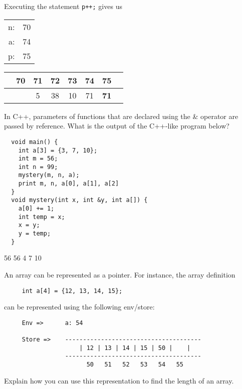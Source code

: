 \documentclass[addpoints]{exam}
\begin{document}
\begin{questions}
\begin{solution}
    Executing the statement \texttt{p++;} gives us

    \begin{tabular}{|r c|}
      \hline
      n: & 70 \\
      a: & 74 \\
      p: & 75 \\
      \hline
    \end{tabular}
    \hspace{1cm}
    \begin{tabular}{c|c|c|c|c|c|c|c}
      \hline
      \multicolumn{1}{c}{} & \multicolumn{1}{c}{70} & \multicolumn{1}{c}{71} & \multicolumn{1}{c}{72} & \multicolumn{1}{c}{73} & \multicolumn{1}{c}{74} & \multicolumn{1}{c}{75} & \\\hline
      &  \bigstrut 38 &  5 & 38 & 10 & 71 & \textbf{71} & \\[1ex]\hline
    \end{tabular}
  \end{solution}

  \newpage
  \question
  In C++, parameters of functions that are declared using the 
  \& operator are passed by reference.
  What is the output of the C++-like program below?
  \begin{verbatim}
  void main() {
    int a[3] = {3, 7, 10};
    int m = 56;
    int n = 99;
    mystery(m, n, a);
    print m, n, a[0], a[1], a[2]
  }
  void mystery(int x, int &y, int a[]) {
    a[0] += 1;
    int temp = x;
    x = y;
    y = temp;
  }
  \end{verbatim}

  \begin{solutionbox}{1cm}
  56 56 4 7 10
  \end{solutionbox}

  \question
  An array can be represented as a pointer.
  For instance, the array definition
  \begin{verbatim}
     int a[4] = {12, 13, 14, 15}; \end{verbatim}
  can be represented using the following env/store:
{\small
  \begin{verbatim}
     Env =>      a: 54

     Store =>    --------------------------------------
                     | 12 | 13 | 14 | 15 | 50 |    |    
                 --------------------------------------
                       50   51   52   53   54   55  
  \end{verbatim}}   
  Explain how you can use this representation to find the length
  of an array.


\end{questions}
\end{document}
